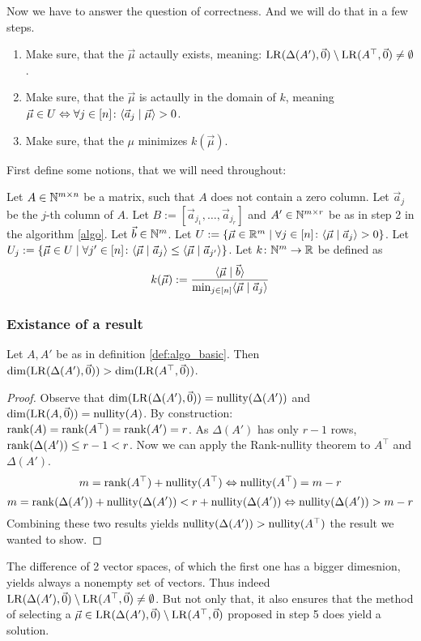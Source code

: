 Now we have to answer the question of correctness. And we will do that in a few steps.
\begin{enumerate}
    \item Make sure, that the $\vec\mu$ actaully exists, meaning: $\operatorname{LR}(\Delta(A'), \vec0) \setminus \operatorname{LR}(A^\top, \vec0) \neq \emptyset$.
    \item Make sure, that the $\vec\mu$ is actaully in the domain of $k$, meaning $\vec\mu \in U \Leftrightarrow \forall j \in [n]\colon \langle \vec a_j \mid \vec\mu \rangle>0$.
    \item Make sure, that the $\mu$ minimizes $k(\vec\mu)$.
\end{enumerate}
First define some notions, that we will need throughout:
\begin{definition}
    \label{def:_algo_basic}
    Let $A \in \mathbb{N}^{m \times n}$ be a matrix, such that $A$ does not contain a zero column. Let $\vec a_j$ be the $j$-th column of $A$. Let $B := [\vec a_{j_1}, \dots, \vec a_{j_r}]$ and $A' \in \mathbb{N}^{m\times r}$ be as in step 2 in the algorithm \ref{algo}. Let $\vec b \in \mathbb{N}^m$. Let $U := \{\vec\mu \in \mathbb{R}^m\mid \forall j \in [n]\colon\langle \vec\mu \mid \vec a_j \rangle > 0\}$. Let $U_j := \{\vec\mu \in U \mid \forall j'\in[n]\colon \langle \vec\mu \mid \vec a_j \rangle \leq \langle \vec\mu \mid \vec a_{j'} \rangle\}$. Let $k\colon \mathbb{N}^m\to\mathbb{R}$ be defined as 
    $$k(\vec\mu) := \frac{\langle \vec\mu \mid \vec b \rangle}{\min_{j\in[n]}\langle \vec\mu \mid \vec a_j \rangle}$$
\end{definition}

\subsubsection{Existance of a result}
\begin{lemma}
    Let $A, A'$ be as in definition \ref{def:algo_basic}. Then $\dim(\operatorname{LR}(\Delta(A'), \vec0)) > \dim(\operatorname{LR}(A^\top, \vec0))$.
\end{lemma}
\begin{proof}
    Observe that $\dim(\operatorname{LR}(\Delta(A'), \vec0)) = \operatorname{nullity}(\Delta(A'))$ and $\dim(\operatorname{LR}(A, \vec0)) = \operatorname{nullity}(A)$. By construction: $\operatorname{rank}(A) = \operatorname{rank}(A^\top) = \operatorname{rank}(A') = r$. As $\Delta(A')$ has only $r-1$ rows, $\operatorname{rank}(\Delta(A')) \leq r-1 < r$. Now we can apply the Rank-nullity theorem to $A^\top$ and $\Delta(A')$.
    $$m = \operatorname{rank}(A^\top) + \operatorname{nullity}(A^\top) \Leftrightarrow \operatorname{nullity}(A^\top) = m - r$$
    $$m = \operatorname{rank}(\Delta(A')) + \operatorname{nullity}(\Delta(A')) < r + \operatorname{nullity}(\Delta(A'))\Leftrightarrow \operatorname{nullity}(\Delta(A')) > m - r$$
    Combining these two results yields $\operatorname{nullity}(\Delta(A')) > \operatorname{nullity}(A^\top)$ the result we wanted to show.
\end{proof}
The difference of 2 vector spaces, of which the first one has a bigger dimesnion, yields always a nonempty set of vectors. Thus indeed $\operatorname{LR}(\Delta(A'), \vec0) \setminus \operatorname{LR}(A^\top, \vec0) \neq \emptyset$. But not only that, it also ensures that the method of selecting a $\vec\mu \in \operatorname{LR}(\Delta(A'), \vec0) \setminus \operatorname{LR}(A^\top, \vec0)$ proposed in step 5 does yield a solution.

